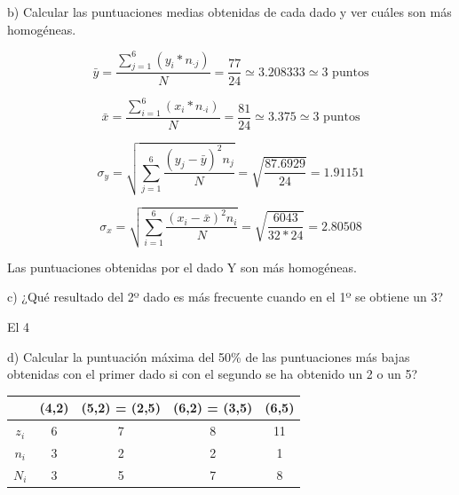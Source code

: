 \documentclass[10pt,a4paper]{article}
\begin{document}
\begin{enumerate}
\vspace{0.5cm}
\hspace{0.25cm} b) Calcular las puntuaciones medias obtenidas de cada dado y ver cuáles son más homogéneas.

\vspace{0.5cm}
\begin{equation*}
\bar{y} = \dfrac{\displaystyle\sum_{j = 1}^6(y_{i}*n_{\cdot j})}{N} = \frac{77}{24} \simeq 3.208333 \simeq 3 \textrm{ puntos}
\end{equation*}

\begin{equation*}
\bar{x} = \dfrac{\displaystyle\sum_{i = 1}^6(x_{i}*n_{\cdot i})}{N} = \frac{81}{24} \simeq 3.375 \simeq 3 \textrm{ puntos} 
\end{equation*}

\begin{equation*}
\sigma_y = \sqrt{\displaystyle\sum_{j = 1}^6 \dfrac{(y_j - \bar{y})^2 n_j}{N}} = \sqrt{\dfrac{87.6929}{24}} = 1.91151
\end{equation*}

\begin{equation*}
\sigma_x = \sqrt{\displaystyle\sum_{i = 1}^6 \dfrac{(x_i - \bar{x})^2 n_i}{N}} = \sqrt{\dfrac{6043}{32*24}} = 2.80508
\end{equation*}

Las puntuaciones obtenidas por el dado Y son más homogéneas.

\vspace{0.5cm}
\hspace{0.25cm} c) ¿Qué resultado del 2º dado es más frecuente cuando en el 1º se obtiene un 3?

El 4

\vspace{0.5cm}
\hspace{0.25cm} d) Calcular la puntuación máxima del 50\% de las puntuaciones más bajas obtenidas con el primer dado si con el segundo se ha obtenido un 2 o un 5?

\vspace{0.25cm}

\begin{tabular}{|c|c|c|c|c|}
\hline 
  & (4,2) & (5,2) = (2,5) & (6,2) = (3,5) & (6,5) \\ 
\hline 
$z_i$ & 6 & 7 & 8 & 11 \\ 
\hline 
$n_i$ & 3 & 2 & 2 & 1 \\ 
\hline 
$N_i$ & 3 & 5 & 7 & 8 \\ 
\hline 
\end{tabular}


\end{enumerate}
\end{document}
